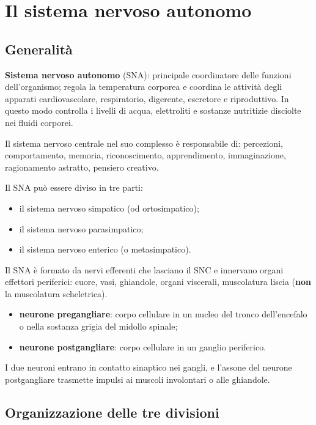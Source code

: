 \chapter{Il sistema nervoso autonomo}

\section{Generalità}

\textbf{Sistema nervoso autonomo} (SNA): principale coordinatore delle
funzioni dell'organismo; regola la temperatura corporea e coordina le
attività degli apparati cardiovascolare, respiratorio, digerente, escretore
e riproduttivo. In questo modo controlla i livelli di acqua, elettroliti e
sostanze nutritizie disciolte nei fluidi corporei.

Il sistema nervoso centrale nel suo complesso è responsabile di: percezioni,
comportamento, memoria, riconoscimento, apprendimento, immaginazione,
ragionamento astratto, pensiero creativo.

Il SNA può essere diviso in tre parti:
\begin{itemize}
  \item il sistema nervoso simpatico (od ortosimpatico);
  \item il sistema nervoso parasimpatico;
  \item il sistema nervoso enterico (o metasimpatico).
\end{itemize}

Il SNA è formato da nervi efferenti che lasciano il SNC e innervano organi
effettori periferici: cuore, vasi, ghiandole, organi viscerali, muscolatura
liscia (\textbf{non} la muscolatura scheletrica).

\begin{itemize}
  \item \textbf{neurone pregangliare}: corpo cellulare in un nucleo del
    tronco dell'encefalo o nella sostanza grigia del midollo spinale;
  \item \textbf{neurone postgangliare}: corpo cellulare in un ganglio
    periferico.
\end{itemize}
I due neuroni entrano in contatto sinaptico nei gangli, e l'assone del
neurone postgangliare trasmette impulsi ai muscoli involontari o alle
ghiandole.

\section{Organizzazione delle tre divisioni}

